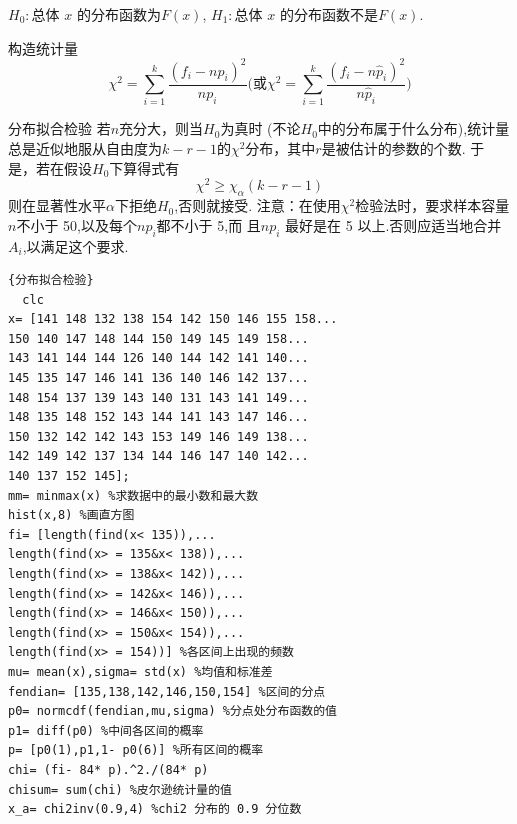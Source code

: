 \documentclass[12pt]{ctexart}
\numberwithin{equation}{section} %
\begin{document}
$H_{0}:$总体 $x$ 的分布函数为$F(x)$,
$H_{1}:$总体 $x$ 的分布函数不是$F(x).$

构造统计量
$$\chi^2 = \sum_{i = 1}^k \frac{( f_i-np_i )^2}{np_i}\bigg( \text{或} \chi^2 = \sum_{i = 1}^k \frac{( f_i-n\hat{p}_i )^2}{n\hat{p}_i}\bigg)$$
\begin{mytheo}{分布拟合检验}
若$n$充分大，则当$H_0$为真时 (不论$H_0$中的分布属于什么分布),统计量 总是近似地服从自由度为$k-r-1$的$\chi^2$分布，其中$r$是被估计的参数的个数.
于是，若在假设$H_{0}$下算得式有
$$\chi^2\geqslant\chi_\alpha(k-r-1)$$
则在显著性水平$\alpha$下拒绝$H_0$,否则就接受.
注意：在使用$\chi^2$检验法时，要求样本容量$n$不小于 50,以及每个$np_i$都不小于 5,而
且$np_i$ 最好是在 5 以上.否则应适当地合并 $A_i$,以满足这个要求.
\end{mytheo}
\begin{lstlisting}{分布拟合检验}
  clc
x= [141 148 132 138 154 142 150 146 155 158...
150 140 147 148 144 150 149 145 149 158...
143 141 144 144 126 140 144 142 141 140...
145 135 147 146 141 136 140 146 142 137...
148 154 137 139 143 140 131 143 141 149...
148 135 148 152 143 144 141 143 147 146...
150 132 142 142 143 153 149 146 149 138...
142 149 142 137 134 144 146 147 140 142...
140 137 152 145];
mm= minmax(x) %求数据中的最小数和最大数
hist(x,8) %画直方图
fi= [length(find(x< 135)),...
length(find(x> = 135&x< 138)),...
length(find(x> = 138&x< 142)),...
length(find(x> = 142&x< 146)),...
length(find(x> = 146&x< 150)),...
length(find(x> = 150&x< 154)),...
length(find(x> = 154))] %各区间上出现的频数
mu= mean(x),sigma= std(x) %均值和标准差
fendian= [135,138,142,146,150,154] %区间的分点
p0= normcdf(fendian,mu,sigma) %分点处分布函数的值
p1= diff(p0) %中间各区间的概率
p= [p0(1),p1,1- p0(6)] %所有区间的概率
chi= (fi- 84* p).^2./(84* p)
chisum= sum(chi) %皮尔逊统计量的值
x_a= chi2inv(0.9,4) %chi2 分布的 0.9 分位数
\end{lstlisting}
\end{document}

